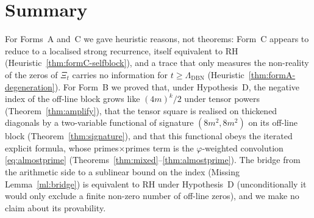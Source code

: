 \documentclass[11pt]{amsart}
\theoremstyle{definition}
\theoremstyle{remark}
\newcommand{\LDBN}{\Lambda_{\mathrm{DBN}}}
\begin{document}
\section{Summary}\label{sec:assessment}

For Forms~A and~C we gave heuristic reasons, not theorems: Form~C appears to reduce to a
localised strong recurrence, itself equivalent to RH (Heuristic~\ref{thm:formC-selfblock}), and
a trace that only measures the non-reality of the zeros of $\Xi_t$ carries no information for
$t\ge\LDBN$ (Heuristic~\ref{thm:formA-degeneration}). For Form~B we proved that, under
Hypothesis~D, the negative index of the off-line block grows like $(4m)^k/2$ under tensor powers
(Theorem~\ref{thm:amplify}), that the tensor square is realised on thickened diagonals by a
two-variable functional of signature $(8m^2,8m^2)$ on its off-line block
(Theorem~\ref{thm:signature}), and that this functional obeys the iterated explicit formula,
whose primes$\times$primes term is the $\varphi$-weighted convolution \eqref{eq:almostprime}
(Theorems~\ref{thm:mixed}--\ref{thm:almostprime}). The bridge from the arithmetic side to a
sublinear bound on the index (Missing Lemma~\ref{ml:bridge}) is equivalent to RH under Hypothesis~D (unconditionally it
would only exclude a finite non-zero number of off-line zeros), and we make
no claim about its provability.
\end{document}
